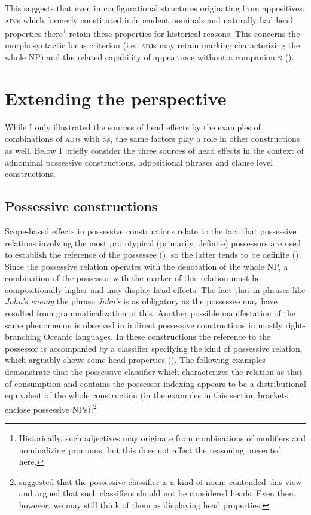 \documentclass[output=paper
  ,nobabel
  ,draftmode
  ,colorlinks, citecolor=brown
]{langscibook}
\begin{document}
\noindent
This  suggests that even in configurational structures originating from appositives, \textsc{adj}s  which formerly constituted independent nominals and naturally had head properties there\footnote{Historically, such adjectives may originate from combinations of modifiers and nominalizing pronouns, but this does not affect the reasoning presented here.} retain these properties for historical reasons. This concerns the morphosyntactic locus criterion (i.e.\ \textsc{adj}s may retain marking characterizing the whole NP) and the related capability of appearance without a companion \textsc{n} (\cite{Lander2010}).

\section{Extending the perspective}\label{sec-extending}
While I only illustrated the sources of head effects by the examples of combinations of
\textsc{adj}s with \textsc{n}s, the same factors play a role in other constructions as well. Below I
briefly consider the three sources of head effects in the context of adnominal possessive
constructions, adpositional phrases and clause level constructions. 

\subsection{Possessive constructions}\label{subsec-possessive}

\largerpage
Scope-based effects in possessive constructions relate to the fact that possessive relations involving the most prototypical (primarily, definite) possessors are used to establish the reference of the possessee (\cite{Keenan1974}), so the latter tends to be definite (\cite{Haspelmath1999}).
Since the possessive relation operates with the denotation of the whole NP, a combination of the
possessor with the marker of this relation must be compositionally higher and may display head
effects. The fact that in phrases like \emph{John's enemy} the phrase \emph{John's} is as obligatory
as the possessee may have resulted from grammaticalization of this. Another possible manifestation
of the same phenomenon is observed in indirect possessive constructions in mostly right-branching
Oceanic languages. In these constructions the reference to the possessor is accompanied by a
classifier specifying the kind of possessive relation, which arguably shows some head properties
(\cite{PalmerBrown2007}). The following examples demonstrate that the possessive classifier which
characterizes the relation as that of consumption and contains the possessor indexing appears to be
a distributional equivalent of the whole construction (in the examples in this section brackets
enclose possessive NPs):\footnote{\citet{PalmerBrown2007} suggested that the possessive classifier
  is a kind of noun. \citet{Lichtenberk2009} contended this view and argued that such classifiers
  should not be considered heads. Even then, however, we may still think of them as displaying head
  properties.} 
\end{document}
